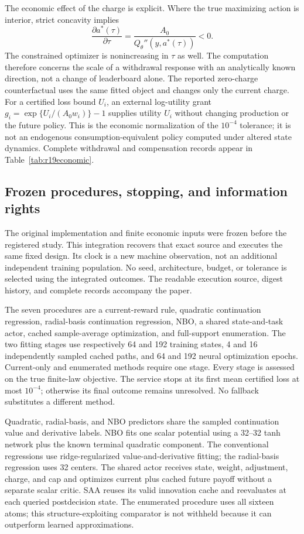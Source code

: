 The economic effect of the charge is explicit. Where the true maximizing
action is interior, strict concavity implies
\begin{equation}
 \frac{\partial a^*(\tau)}{\partial\tau}
             =\frac{A_0}{Q_\theta''(y,a^*(\tau))}<0.
 \label{eq:r19charge}
\end{equation}
The constrained optimizer is nonincreasing in $\tau$ as well. The computation
therefore concerns the scale of a withdrawal response with an analytically
known direction, not a change of leaderboard alone. The reported zero-charge
counterfactual uses the same fitted object and changes only the current
charge. For a certified loss bound $U_i$, an external log-utility grant
$g_i=\exp\{U_i/(A_0w_i)\}-1$ supplies utility $U_i$ without changing
production or the future policy. This is the economic normalization of the
$10^{-4}$ tolerance; it is not an endogenous consumption-equivalent policy
computed under altered state dynamics. Complete withdrawal and compensation
records appear in Table~\ref{tab:r19economic}.

\subsection{Frozen procedures, stopping, and information rights}
The original implementation and finite economic inputs were frozen before
the registered study. This integration recovers that exact source and
executes the same fixed design. Its clock is a new machine observation,
not an additional independent training population. No seed, architecture,
budget, or tolerance is selected using the integrated outcomes. The readable
execution source, digest history, and complete records accompany the paper.

The seven procedures are a current-reward rule, quadratic continuation
regression, radial-basis continuation regression, NBO, a shared
state-and-task actor, cached sample-average optimization, and full-support
enumeration. The two fitting stages use respectively 64 and 192 training
states, 4 and 16 independently sampled cached paths, and 64 and 192 neural
optimization epochs. Current-only and enumerated methods require one stage.
Every stage is assessed on the true finite-law objective. The service stops
at its first mean certified loss at most $10^{-4}$; otherwise its final
outcome remains unresolved. No fallback substitutes a different method.

Quadratic, radial-basis, and NBO predictors share the sampled continuation
value and derivative labels. NBO fits one scalar potential using a
32--32 tanh network plus the known terminal quadratic component. The
conventional regressions use ridge-regularized value-and-derivative fitting;
the radial-basis regression uses 32 centers. The shared actor receives state,
weight, adjustment, charge, and cap and optimizes current plus cached future
payoff without a separate scalar critic. SAA reuses its valid innovation
cache and reevaluates at each queried postdecision state. The enumerated
procedure uses all sixteen atoms; this structure-exploiting comparator is
not withheld because it can outperform learned approximations.


